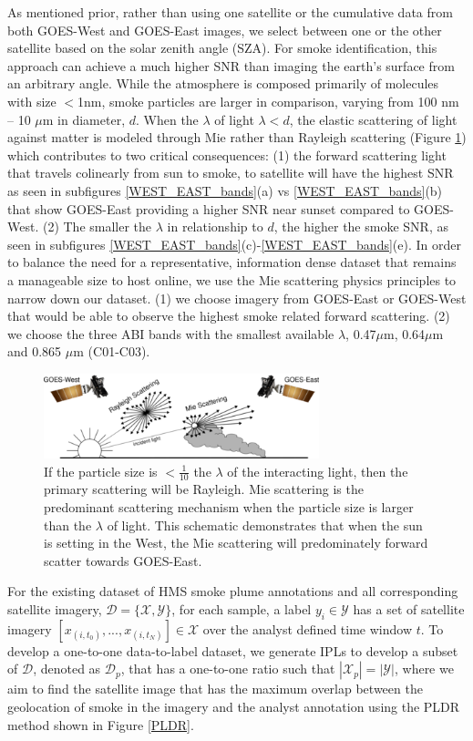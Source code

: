 \documentclass{article}
\begin{document}
As mentioned prior, rather than using one satellite or the cumulative data from both GOES-West and GOES-East images, we select between one or the other satellite based on the solar zenith angle (SZA). For smoke identification, this approach can achieve a much higher SNR than imaging the earth’s surface from an arbitrary angle. While the atmosphere is composed primarily of molecules with size \(<\)1nm, smoke particles are larger in comparison, varying from 100 nm -- 10 \(\mu\)m in diameter, \(d\). When the \(\lambda\) of light \(\lambda<d\), the elastic scattering of light against matter is modeled through Mie rather than Rayleigh scattering (Figure \ref{mei}) which contributes to two critical consequences: (1) the forward scattering light that travels colinearly from sun to smoke, to satellite will have the highest SNR as seen in subfigures \ref{WEST_EAST_bands}(a) vs \ref{WEST_EAST_bands}(b) that show GOES-East providing a higher SNR near sunset compared to GOES-West. (2) The smaller the \(\lambda\) in relationship to \(d\), the higher the smoke SNR, as seen in subfigures \ref{WEST_EAST_bands}(c)-\ref{WEST_EAST_bands}(e). In order to balance the need for a representative, information dense dataset that remains a manageable size to host online, we use the Mie scattering physics principles to narrow down our dataset. (1) we choose imagery from GOES-East or GOES-West that would be able to observe the highest smoke related forward scattering. (2) we choose the three ABI bands with the smallest available \(\lambda\), 0.47\(\mu\)m, 0.64\(\mu\)m and 0.865 \(\mu\)m (C01-C03). 


\begin{figure}[!htb]
    \centering
    \includegraphics[width=8cm]{figures/mei_small.png}
    \caption{If the particle size is \(<\frac{1}{10}\) the \(\lambda\) of the interacting light, then the primary scattering will be Rayleigh. Mie scattering is the predominant scattering mechanism when the particle size is larger than the \(\lambda\) of light. This schematic demonstrates that when the sun is setting in the West, the Mie scattering will predominately forward scatter towards GOES-East.} \label{mei}
\end{figure}

For the existing dataset of HMS smoke plume annotations and all corresponding satellite imagery, \(\mathcal{D} = \{\mathcal{X}, \mathcal{Y}\}\), for each sample, a label \(y_i \in \mathcal{Y}\) has a set of satellite imagery \([x_{(i,t_0)},...,x_{(i,t_N)}] \in \mathcal{X}\) over the analyst defined time window \(t\). To develop a one-to-one data-to-label dataset, we generate IPLs to develop a subset of \(\mathcal{D}\), denoted as \(\mathcal{D}_p\), that has a one-to-one ratio such that \(|\mathcal{X}_p| = |\mathcal{Y}|\), where we aim to find the satellite image that has the maximum overlap between the geolocation of smoke in the imagery and the analyst annotation using the PLDR method shown in Figure \ref{PLDR}.
\end{document}
